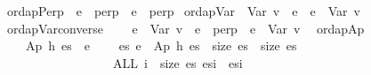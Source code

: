 \documentclass{llncs}
\newenvironment{isacode}
{\begin{list}{}{
\setlength{\leftmargin}{4pt}
\setlength{\rightmargin}{0pt}
\setlength{\listparindent}{0pt}\raggedright
\setlength{\itemsep}{0pt}
\setlength{\parsep}{0pt}
\normalfont\ttfamily }\item[]}
{\end{list}}
\begin{document}
\begin{minipage}{\linewidth}
\begin{isacode}
\isamarkupfalse \ ordapPerp{\isacharcolon}\ \ {\isachardoublequoteopen}e\ {\isasymsqsubseteq}\ perp{\isachardoublequoteclose}\ \ {\isachardoublequoteopen}e\ {\isacharequal}\ perp{\isachardoublequoteclose}
\isanewline
{}\isamarkupfalse \ ordapVar{\isacharcolon}\ \ {\isachardoublequoteopen}Var\ v\ {\isasymsqsubseteq}\ e{\isachardoublequoteclose}\ \ {\isachardoublequoteopen}e\ {\isacharequal}\ Var\ v{\isachardoublequoteclose}\isanewline
{}\isamarkupfalse \ ordapVar{\isacharunderscore}converse{\isacharcolon}\isanewline
\ \ \ \ {\isachardoublequoteopen}e\ {\isasymsqsubseteq}\ Var\ v{\isachardoublequoteclose}\ \ {\isachardoublequoteopen}e\ {\isacharequal}\ perp\ {\isasymor}\ e\ {\isacharequal}\ Var\ v{\isachardoublequoteclose}\ \isanewline
{}\isamarkupfalse \ ordapAp{\isacharcolon}\isanewline
\ \ \ \ {\isachardoublequoteopen}Ap\ h\ es\ {\isasymsqsubseteq}\ e{\isacharprime}{\isachardoublequoteclose}\isanewline
\ \ \ \ {\isachardoublequoteopen}{\isasymexists}es{\isacharprime}{\isachardot}\ e{\isacharprime}\ {\isacharequal}\ Ap\ h\ es{\isacharprime}\ {\isasymand}\ size\ es\ {\isacharequal}\ size\ es{\isacharprime}\isanewline
\ \ \ \ \ \ \ \ \ \ \ \ \ \ \ \ \ {\isasymand}\ {\isacharparenleft}ALL\ i\ {\isacharless}\ size\ es{\isachardot}\ es{\isacharbang}i\ {\isasymsqsubseteq}\ es{\isacharprime}{\isacharbang}i{\isacharparenright}{\isachardoublequoteclose}\isanewline

\end{isacode}
\end{minipage}
\end{document}
